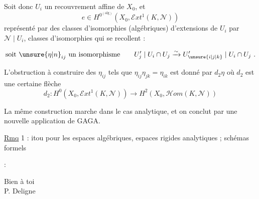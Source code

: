 \noindent Soit donc \(U_i\) un recouvrement affine de \(X_0\), et
\[
 e\in H^{0^{(\mathrm{alg})}}(X_0,\mathscr{E}xt^1(K,\mathscr{N}))
\]
représenté par des classes d'isomorphies (algébriques) d'extensions
 de \(U_i\) par \(\mathscr{N}\mid U_i\), classes d'isomorphies qui se recollent :

\[
 \text{soit }\unsure{\eta|n}_{ij}\text{ un isomorphisme}\qquad
 U'_j\mid U_i\cap U_j
 \xrightarrow{\sim}
 U'_{\unsure{i|j|k}}\mid U_i\cap U_j\ .
\]

L'obstruction à construire des \(\eta_{ij}\) tels que \(\eta_{ij}\eta_{jk}=\eta_{ik}\) est donné par \(d_2\eta\) où \(d_2\) est une certaine flèche
\[
 d_2:H^0(X_0,\mathscr{E}xt^1(K,\mathscr{N}))\longrightarrow
 H^2(X_0,\mathscr{H}om(K,\mathscr{N}))
\]

La même construction marche dans le cas analytique, et on conclut par une nouvelle application de GAGA.

\uline{Rmq} 1 : itou pour les espaces algébriques, espaces rigides analytiques ; schémas formels

 :

\noindent\hfill Bien à toi\\
\null\hfill P. Deligne\\
\clearpage
